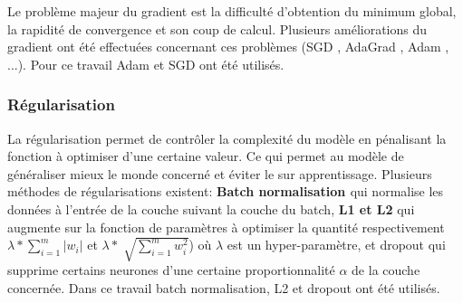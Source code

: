 Le problème majeur du gradient est la difficulté d'obtention du minimum global, la rapidité de convergence et son coup de calcul. Plusieurs améliorations du gradient ont été effectuées concernant ces problèmes (SGD \cite{sgd_}, AdaGrad \cite{adagrad}, Adam \cite{adam}, ...). Pour ce travail Adam et SGD ont été utilisés.


\subsubsection{Régularisation}
La régularisation permet de contrôler la complexité du modèle en pénalisant la fonction à optimiser d'une certaine valeur. Ce qui permet au modèle de généraliser mieux le monde concerné et éviter le sur apprentissage. Plusieurs méthodes de régularisations existent:
\textbf{Batch normalisation \cite{batch}} qui normalise les données à l'entrée de la couche suivant la couche du batch, \textbf{L1 et L2} qui augmente sur la fonction de paramètres à optimiser la quantité respectivement $\lambda * \sum \limits_{i = 1}^m |w_i|$ et  $\lambda * \sqrt[\,] {\sum \limits_{i = 1}^m w_i^2} $)
 où $\lambda$ est un hyper-paramètre, et dropout qui supprime certains neurones d'une certaine proportionnalité $\alpha$ de la couche concernée. Dans ce travail batch normalisation, L2 et dropout ont été utilisés.
